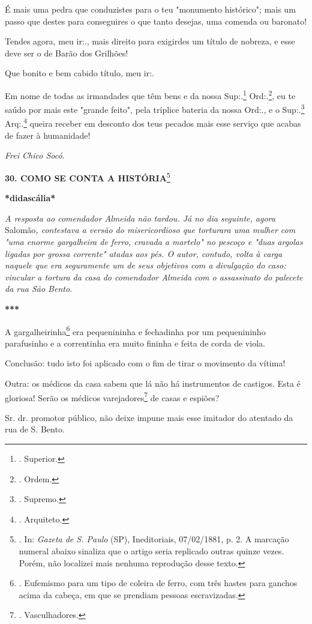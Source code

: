 É mais uma pedra que conduzistes para o teu "monumento histórico"; mais
um passo que destes para conseguires o que tanto desejas, uma comenda ou
baronato!

Tendes agora, meu ir:., mais direito para exigirdes um título de
nobreza, e esse deve ser o de Barão dos Grilhões!

Que bonito e bem cabido título, meu ir:.

Em nome de todas as irmandades que têm bens e da nossa Sup:.\footnote{.
  Superior.} Ord:.\footnote{. Ordem.}, eu te saúdo por mais este "grande
feito", pela tríplice bateria da nossa Ord:., e o Sup:.\footnote{.
  Supremo.} Arq:.\footnote{. Arquiteto.}
queira receber em desconto
dos teus pecados mais esse serviço que acabas de fazer à humanidade!

\emph{Frei Chico Socó}.

\textbf{30. COMO SE CONTA A HISTÓRIA}\footnote{. In: \emph{Gazeta de S.
  Paulo} (SP), Ineditoriais, 07/02/1881, p. 2. A marcação numeral abaixo
  sinaliza que o artigo seria replicado outras quinze vezes. Porém, não
  localizei mais nenhuma reprodução desse texto.}

\textbf{*didascália*}

\emph{A resposta ao comendador Almeida não tardou. Já no dia seguinte,
agora} Salomão\emph{, contestava a versão do misericordioso que
torturara uma mulher com "uma enorme gargalheira de ferro, cravada a
martelo" no pescoço e "duas argolas ligadas por grossa corrente" atadas
aos pés. O autor, contudo, volta à carga naquele que era seguramente um
de seus objetivos com a divulgação do caso: vincular a tortura da casa
do comendador Almeida com o assassinato do palecete da rua São Bento. }

\textbf{***}

A gargalheirinha\footnote{. Eufemismo para um tipo de coleira de ferro,
  com três hastes para ganchos acima da cabeça, em que se prendiam
  pessoas escravizadas.} era pequenininha e fechadinha por um
pequenininho parafusinho e a correntinha era muito fininha e feita de
corda de viola.

Conclusão: tudo isto foi aplicado com o fim de tirar o movimento da
vítima!

Outra: os médicos da casa sabem que lá não há instrumentos de castigos.
Esta é gloriosa! Serão os médicos varejadores\footnote{. Vasculhadores.}
de casas e espiões?

Sr. dr. promotor público, não deixe impune mais esse imitador do
atentado da rua de S. Bento.

